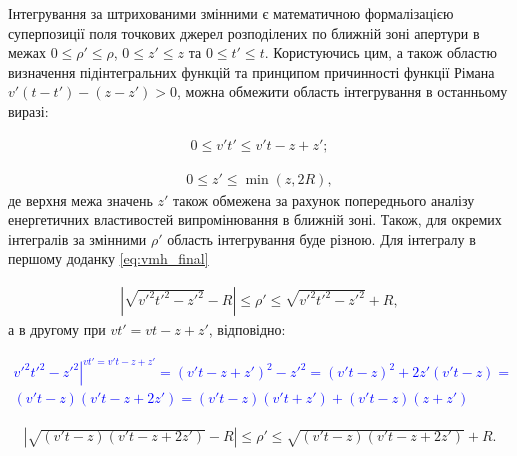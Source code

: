 Інтегрування за штрихованими змінними є математичною формалізацією 
суперпозиції поля точкових джерел розподілених по ближній зоні апертури
в межах 
$ 0 \leq \rho' \leq \rho $, $ 0 \leq z' \leq z $ та $ 0 \leq t' \leq t $. 
Користуючись цим, а також областю визначення підінтегральних функцій та 
принципом причинності функції Рімана $ v'(t-t')-(z-z') > 0 $, можна обмежити 
область інтегрування в останньому виразі:

\begin{equation} \begin{aligned}
0 \leq v't' \leq v't - z + z';
\end{aligned} \end{equation}

\begin{equation} \begin{aligned}
0 \leq z' \leq \min(z,2R),
\end{aligned} \end{equation}
%
де верхня межа значень $ z' $ також обмежена за рахунок попереднього аналізу 
енергетичних властивостей випромінювання в ближній зоні. Також, для окремих 
інтегралів за змінними $ \rho' $ область інтегрування буде різною. Для 
інтегралу в першому доданку \eqref{eq:vmh_final}

\begin{equation} \begin{aligned}
\left| \sqrt{v'^2t'^2 - z'^2} - R \right| \leq \rho' \leq 
\sqrt{v'^2t'^2 - z'^2} + R,
\end{aligned} \end{equation}
%
а в другому при $ vt' = vt - z + z' $, відповідно:

\textcolor{blue} { \begin{equation*} \begin{aligned}
\left. v'^2 t'^2 - z'^2 \right|^{vt' = v't - z + z'} = 
(v't - z + z')^2 - z'^2 = (v't - z)^2 + 2 z' (v't - z) = \\
(v't - z) (v't - z + 2 z') = (v't - z) (v't + z') + (v't - z) (z + z')
\end{aligned} \end{equation*} }

\begin{equation} \begin{aligned}
\left| \sqrt{(v't - z) (v't - z + 2 z')} - R \right| \leq \rho' \leq 
\sqrt{(v't - z) (v't - z + 2 z')} + R.
\end{aligned} \end{equation}

